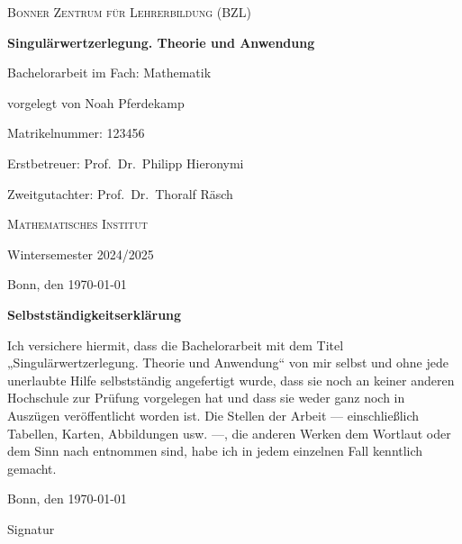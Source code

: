 \begin{titlepage}
    \centering

    
    {\LARGE\textsc{ Bonner Zentrum für Lehrerbildung (BZL)}}\par\vspace{5cm}

    
    {\Huge\bfseries Singulärwertzerlegung. Theorie und Anwendung}\par\vspace{1.5cm}

    
    {\Large Bachelorarbeit im Fach: Mathematik}\par\vspace{1cm}

    
    {\Large vorgelegt von Noah Pferdekamp}\par\vspace{2pt}
    {\large Matrikelnummer: \color{red}123456}\par\vspace{1cm}

    
    {\large Erstbetreuer: Prof.\ Dr.\ Philipp Hieronymi}\par\vspace{2pt}
    {\large Zweitgutachter: Prof.\ Dr.\ Thoralf Räsch}\par\vspace{2pt}
    {\large\textsc{Mathematisches Institut}\par\vspace{1cm}}

    
    {\large Wintersemester 2024/2025}\par\vspace{2pt}
    {\large Bonn, den \today}\par

    
\end{titlepage}
\thispagestyle{empty}
\noindent\textbf{Selbstständigkeitserklärung}
\vspace{1em}


\noindent Ich versichere hiermit, dass die Bachelorarbeit mit dem Titel „Singulärwertzerlegung. Theorie und Anwendung“ von mir selbst und ohne jede unerlaubte Hilfe selbstständig angefertigt wurde, dass sie noch an keiner anderen Hochschule zur Prüfung vorgelegen hat und dass sie weder ganz noch in Auszügen veröffentlicht worden ist. Die Stellen der Arbeit ---  einschließlich Tabellen, Karten, Abbildungen usw. ---, die anderen Werken dem Wortlaut oder dem Sinn nach entnommen sind, habe ich in jedem einzelnen Fall kenntlich gemacht. 
\vspace{1em}

\noindent Bonn, den \today

\vspace{-2pt}
{\color{red} Signatur}